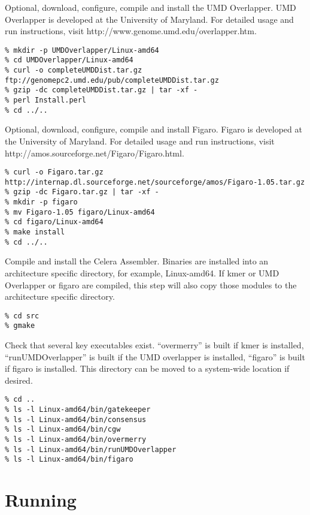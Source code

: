 \documentclass[twoside,11pt]{article}
\begin{document}
Optional, download, configure, compile and install the UMD Overlapper.  UMD Overlapper is developed at the University of Maryland. For detailed usage and run instructions, visit http://www.genome.umd.edu/overlapper.htm.

\begin{verbatim}
% mkdir -p UMDOverlapper/Linux-amd64
% cd UMDOverlapper/Linux-amd64
% curl -o completeUMDDist.tar.gz ftp://genomepc2.umd.edu/pub/completeUMDDist.tar.gz
% gzip -dc completeUMDDist.tar.gz | tar -xf -
% perl Install.perl
% cd ../..
\end{verbatim}

Optional, download, configure, compile and install Figaro.  Figaro is developed at the University of Maryland. For detailed usage and run instructions, visit http://amos.sourceforge.net/Figaro/Figaro.html.

\begin{verbatim}
% curl -o Figaro.tar.gz http://internap.dl.sourceforge.net/sourceforge/amos/Figaro-1.05.tar.gz
% gzip -dc Figaro.tar.gz | tar -xf -
% mkdir -p figaro
% mv Figaro-1.05 figaro/Linux-amd64
% cd figaro/Linux-amd64
% make install
% cd ../..
\end{verbatim}

Compile and install the Celera Assembler.  Binaries are installed into
an architecture specific directory, for example, Linux-amd64.  If kmer
or UMD Overlapper or figaro are compiled, this step will also copy those modules
to the architecture specific directory.

\begin{verbatim}
% cd src
% gmake
\end{verbatim}

Check that several key executables exist.  ``overmerry'' is built if
kmer is installed, ``runUMDOverlapper'' is built if the UMD overlapper
is installed, ``figaro'' is built if figaro is installed.  This directory
can be moved to a system-wide location if desired.

\begin{verbatim}
% cd ..
% ls -l Linux-amd64/bin/gatekeeper
% ls -l Linux-amd64/bin/consensus
% ls -l Linux-amd64/bin/cgw
% ls -l Linux-amd64/bin/overmerry
% ls -l Linux-amd64/bin/runUMDOverlapper
% ls -l Linux-amd64/bin/figaro
\end{verbatim}

\section{Running}
\end{document}
